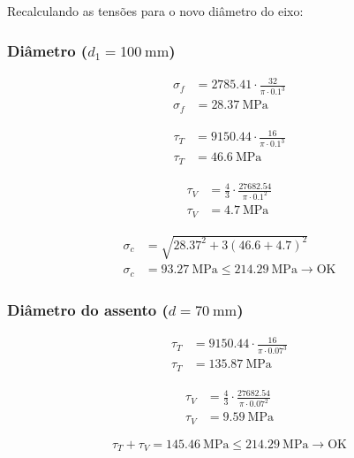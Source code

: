 Recalculando as tensões para o novo diâmetro do eixo:

\subsubsection{Diâmetro ($d_1 = \SI{100}{\milli\meter}$)}

\begin{align*}
  \sigma_f & = \num{2785.41} \cdot \frac{32}{\pi \cdot \num{0.1}^3} \\
  \sigma_f & = \boxed{\SI{28.37}{\mega\pascal}}
\end{align*}

\begin{align*}
  \tau_T & = \num{9150.44} \cdot \frac{16}{\pi \cdot \num{0.1}^3} \\
  \tau_T & = \boxed{\SI{46.6}{\mega\pascal}}
\end{align*}

\begin{align*}
  \tau_V & = \frac{4}{3} \cdot \frac{\num{27682.54}}{\pi \cdot \num{0.1}^2} \\
  \tau_V & = \boxed{\SI{4.7}{\mega\pascal}}
\end{align*}

\begin{align*}
  \sigma_c & = \sqrt{\num{28.37}^2 + 3 \left( \num{46.6} + \num{4.7} \right)^2}                      \\
  \sigma_c & = \boxed{\SI{93.27}{\mega\pascal}} \leq \SI{214.29}{\mega\pascal} \rightarrow \text{OK}
\end{align*}

\subsubsection{Diâmetro do assento ($d = \SI{70}{\milli\meter}$)}

\begin{align*}
  \tau_T & = \num{9150.44} \cdot \frac{16}{\pi \cdot \num{0.07}^3} \\
  \tau_T & = \boxed{\SI{135.87}{\mega\pascal}}
\end{align*}

\begin{align*}
  \tau_V & = \frac{4}{3} \cdot \frac{\num{27682.54}}{\pi \cdot \num{0.07}^2} \\
  \tau_V & = \boxed{\SI{9.59}{\mega\pascal}}
\end{align*}

\begin{equation*}
  \tau_T + \tau_V = \boxed{\SI{145.46}{\mega\pascal}} \leq \SI{214.29}{\mega\pascal} \rightarrow \text{OK}
\end{equation*}
